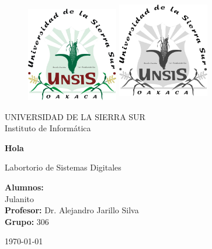 \documentclass[letterpaper,12pt]{extarticle}%
\begin{document}
    \begin{titlepage}
		\begin{figure}[ht]
				\includegraphics[width=4cm]{imag//logColor.jpg}
				\label{escudoFI}
		   \endminipage
				\includegraphics[height = 4.5cm ,width=4cm]{imag//logBN.jpg}
				\label{EscuoUNAM}
			\endminipage
		\end{figure}
		
		\vspace{0.5cm}
		
		\begin{center}
			\LARGE UNIVERSIDAD DE LA SIERRA SUR \\
			\vspace{0.3cm}
			\LARGE Instituto de Informática
			
			\vspace{.7cm} {\LARGE  \textbf{Hola} \\}

			\vspace{.7cm} {\LARGE Labortorio de Sistemas Digitales}

			\vspace{.5cm}
			\begin{center}

				\LARGE{ \textbf{Alumnos:}}\\%
        \LARGE{Julanito}\\%
				\vspace{0.5cm}
				\textbf{Profesor:}  Dr. Alejandro Jarillo Silva \\
				\vspace{0.5cm}
				\textbf{Grupo:}  306
				
			\end{center}
			
			\vspace{1cm} \today
		\end{center}
\end{titlepage}
\end{document}
